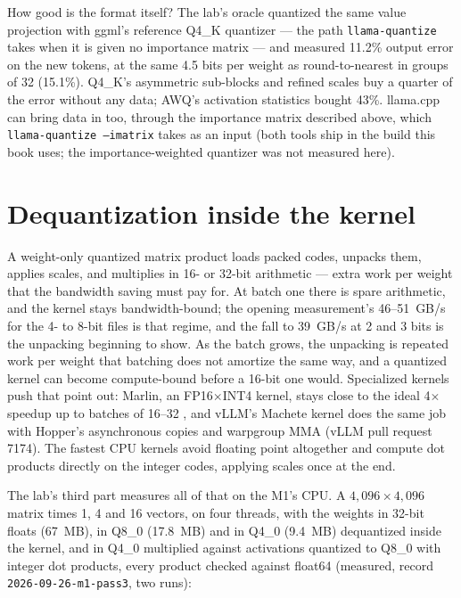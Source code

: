 How good is the format itself? The lab's oracle quantized the same value
projection with ggml's reference Q4\_K quantizer --- the path
\texttt{llama-quantize} takes when it is given no importance matrix --- and
measured 11.2\% output error on the new tokens, at the same 4.5 bits per weight
as round-to-nearest in groups of 32 (15.1\%). Q4\_K's asymmetric sub-blocks and
refined scales buy a quarter of the error without any data; AWQ's activation
statistics bought 43\%. llama.cpp can bring data in too, through the importance
matrix described above, which \texttt{llama-quantize --imatrix} takes as an input
(both tools ship in the build this book uses; the importance-weighted quantizer
was not measured here).

\section{Dequantization inside the kernel}

A weight-only quantized matrix product loads packed codes, unpacks them,
applies scales, and multiplies in 16- or 32-bit arithmetic --- extra work per
weight that the bandwidth saving must pay for. At batch one there is spare
arithmetic, and the kernel stays bandwidth-bound; the opening measurement's
46--51~GB/s for the 4- to 8-bit files is that regime, and the fall to
39~GB/s at 2 and 3 bits is the unpacking beginning to show. As the batch
grows, the unpacking is repeated work per weight that batching does not
amortize the same way, and a quantized kernel can become compute-bound before
a 16-bit one would. Specialized kernels push that point out: Marlin, an
FP16$\times$INT4 kernel, stays close to the ideal 4$\times$ speedup up to
batches of 16--32 \cite{frantar2024marlin}, and vLLM's Machete kernel does the
same job with Hopper's asynchronous copies and warpgroup MMA (vLLM pull request
7174). The fastest CPU kernels avoid floating point altogether and compute dot
products directly on the integer codes, applying scales once at the end.

The lab's third part measures all of that on the M1's CPU. A
$4{,}096 \times 4{,}096$ matrix times 1, 4 and 16 vectors, on four threads, with
the weights in 32-bit floats (67~MB), in Q8\_0 (17.8~MB) and in Q4\_0 (9.4~MB)
dequantized inside the kernel, and in Q4\_0 multiplied against activations
quantized to Q8\_0 with integer dot products, every product checked against
float64 (measured, record \texttt{2026-09-26-m1-pass3}, two runs):

